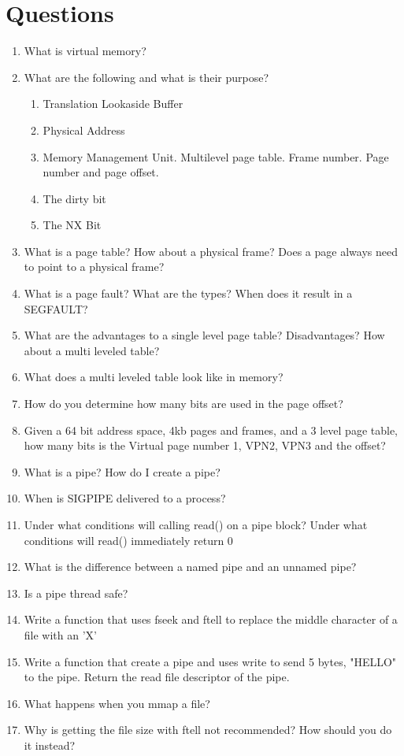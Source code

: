 \section{Questions}

\begin{enumerate}
\item What is virtual memory?
\item What are the following and what is their purpose?
  \begin{enumerate}
    \item Translation Lookaside Buffer
    \item Physical Address
    \item Memory Management Unit. Multilevel page table. Frame number. Page number and page offset.
    \item The dirty bit
    \item The NX Bit
  \end{enumerate}
\item What is a page table? How about a physical frame? Does a page always need to point to a physical frame?
\item What is a page fault? What are the types? When does it result in a SEGFAULT?
\item What are the advantages to a single level page table? Disadvantages? How about a multi leveled table?
\item What does a multi leveled table look like in memory?
\item How do you determine how many bits are used in the page offset?
\item Given a 64 bit address space, 4kb pages and frames, and a 3 level page table, how many bits is the Virtual page number 1, VPN2, VPN3 and the offset?
\item What is a pipe? How do I create a pipe?
\item When is SIGPIPE delivered to a process?
\item Under what conditions will calling read() on a pipe block? Under what conditions will read() immediately return 0
\item What is the difference between a named pipe and an unnamed pipe?
\item Is a pipe thread safe?
\item Write a function that uses fseek and ftell to replace the middle character of a file with an 'X'
\item Write a function that create a pipe and uses write to send 5 bytes, "HELLO" to the pipe. Return the read file descriptor of the pipe.
\item What happens when you mmap a file?
\item Why is getting the file size with ftell not recommended? How should you do it instead?
\end{enumerate}




